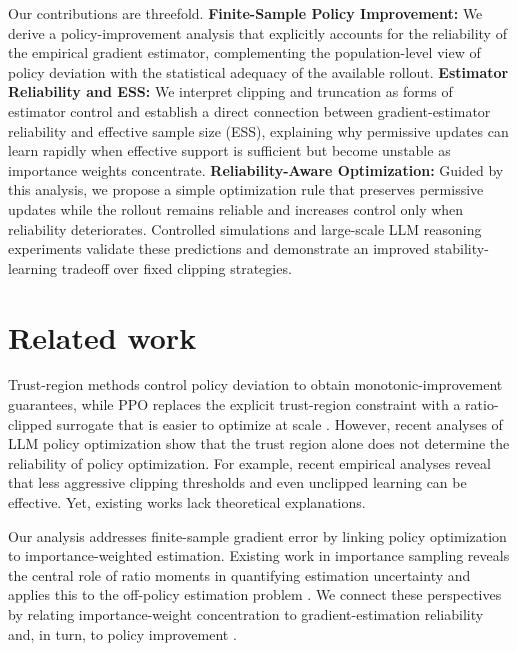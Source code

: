 \documentclass[11pt]{article}
\theoremstyle{remark}
\begin{document}

Our contributions are threefold. \textbf{Finite-Sample Policy Improvement:} We derive a policy-improvement analysis that explicitly accounts for the reliability of the empirical gradient estimator, complementing the population-level view of policy deviation with the statistical adequacy of the available rollout. \textbf{Estimator Reliability and ESS:} We interpret clipping and truncation as forms of estimator control and establish a direct connection between gradient-estimator reliability and effective sample size (ESS), explaining why permissive updates can learn rapidly when effective support is sufficient but become unstable as importance weights concentrate. \textbf{Reliability-Aware Optimization:} Guided by this analysis, we propose a simple optimization rule that preserves permissive updates while the rollout remains reliable and increases control only when reliability deteriorates. Controlled simulations and large-scale LLM reasoning experiments validate these predictions and demonstrate an improved stability-learning tradeoff over fixed clipping strategies.

\section{Related work}


Trust-region methods control policy deviation to obtain monotonic-improvement guarantees, while PPO replaces the explicit trust-region constraint with a ratio-clipped surrogate that is easier to optimize at scale
\citep{schulman2015trpo,schulman2017ppo}. However, recent analyses of LLM policy optimization show that the trust region alone does not determine the reliability of policy optimization. For example, recent empirical analyses reveal that less aggressive clipping thresholds \citep{yu2025dapo,park2025clipping,minimax2025m1,qi2026dppo} and even unclipped learning can be effective. Yet, existing works lack theoretical explanations.

Our analysis addresses finite-sample gradient error by linking policy optimization to importance-weighted estimation. Existing work in importance sampling reveals the central role of ratio moments in quantifying estimation uncertainty and applies this to the off-policy estimation problem \citep{metelli2018pois,metelli2020is}. We connect these
perspectives by relating importance-weight concentration to
gradient-estimation reliability and, in turn, to policy improvement \citep{pirotta2013adaptive,papini2022smoothing}.
\end{document}
